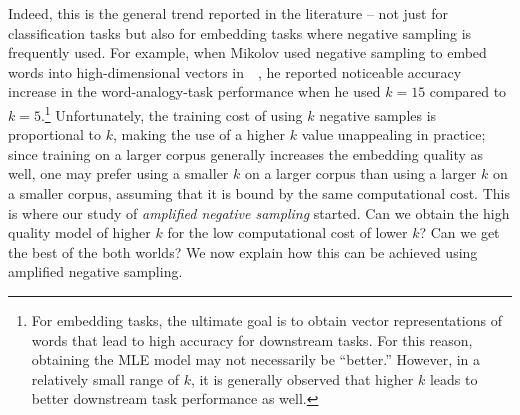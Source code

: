 Indeed, this is the general trend reported in the literature -- not just for classification tasks but also for embedding tasks where negative sampling is frequently used. For example, when Mikolov used negative sampling to embed words into high-dimensional vectors in~~\citep{mikolov2013distributed}, he reported noticeable accuracy increase in the word-analogy-task performance when he used $k=15$ compared to $k=5$.\footnote{For embedding tasks, the ultimate goal is to obtain vector representations of words that lead to high accuracy for downstream tasks. For this reason, obtaining the MLE model may not necessarily be ``better.'' However, in a relatively small range of $k$, it is generally observed that higher $k$ leads to better downstream task performance as well.} Unfortunately, the training cost of using $k$ negative samples is proportional to $k$, making the use of a higher $k$ value unappealing in practice; since training on a larger corpus generally increases the embedding quality as well, one may prefer using a smaller $k$ on a larger corpus than using a larger $k$ on a smaller corpus, assuming that it is bound by the same computational cost. This is where our study of \emph{amplified negative sampling} started. Can we obtain the high quality model of higher $k$ for the low computational cost of lower $k$? Can we get the best of the both worlds? We now explain how this can be achieved using amplified negative sampling.

